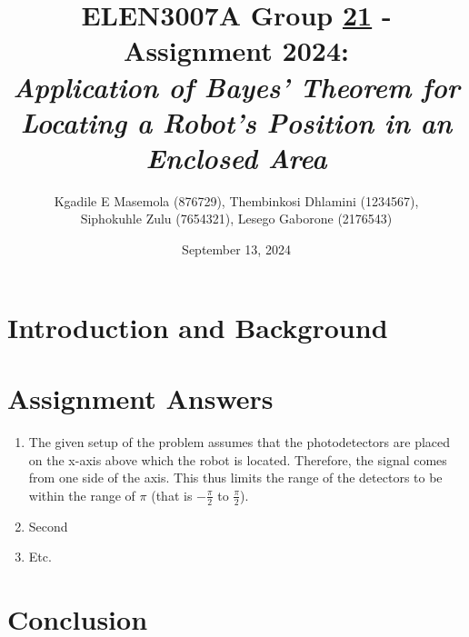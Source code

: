 \documentclass[a4paper,11pt]{article}
\title{ELEN3007A Group \underline{21} - Assignment 2024: \\ 
\large \emph{Application of Bayes’ Theorem for Locating a Robot’s
Position in an Enclosed Area}}
\author{Kgadile E Masemola (876729),  Thembinkosi Dhlamini (1234567),
 \\Siphokuhle Zulu (7654321), Lesego Gaborone (2176543)}
\date{September 13, 2024}
\begin{document}
\maketitle

\section*{Introduction and Background}

\section*{Assignment Answers}
\begin{enumerate}
  \item The given setup of the problem assumes that the photodetectors are placed on the x-axis above which the robot is located. Therefore, the signal comes from one side of the axis. This thus limits the range of the detectors to be within the range of $\pi$ (that is $-\frac{\pi}{2}$ to $\frac{\pi}{2}$). 
  \item Second
  \item Etc.
\end{enumerate}

\section*{Conclusion}
\end{document}
